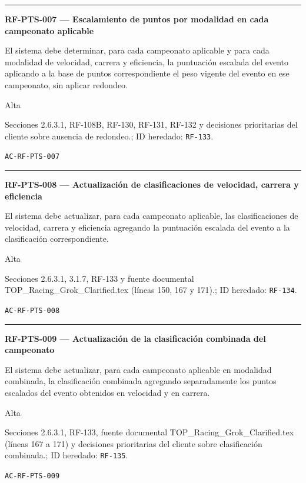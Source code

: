 \documentclass[10pt,letterpaper]{article}
\begin{document}
\vspace{0.25em}\hrule\vspace{0.65em}
\noindent\textbf{RF-PTS-007 --- Escalamiento de puntos por modalidad en cada campeonato aplicable}\par
\begin{description}[style=nextline,leftmargin=3.15cm,labelwidth=2.8cm,font=\normalfont\bfseries]
\item[Obligación] El sistema debe determinar, para cada campeonato aplicable y para cada modalidad de velocidad, carrera y eficiencia, la puntuación escalada del evento aplicando a la base de puntos correspondiente el peso vigente del evento en ese campeonato, sin aplicar redondeo.
\item[Prioridad] Alta
\item[Procedencia] Secciones 2.6.3.1, RF-108B, RF-130, RF-131, RF-132 y decisiones prioritarias del cliente sobre ausencia de redondeo.; ID heredado: \texttt{RF-133}.
\item[Verificación] \texttt{AC-RF-PTS-007}
\end{description}
\vspace{0.25em}\hrule\vspace{0.65em}
\noindent\textbf{RF-PTS-008 --- Actualización de clasificaciones de velocidad, carrera y eficiencia}\par
\begin{description}[style=nextline,leftmargin=3.15cm,labelwidth=2.8cm,font=\normalfont\bfseries]
\item[Obligación] El sistema debe actualizar, para cada campeonato aplicable, las clasificaciones de velocidad, carrera y eficiencia agregando la puntuación escalada del evento a la clasificación correspondiente.
\item[Prioridad] Alta
\item[Procedencia] Secciones 2.6.3.1, 3.1.7, RF-133 y fuente documental TOP\_Racing\_Grok\_Clarified.tex (líneas 150, 167 y 171).; ID heredado: \texttt{RF-134}.
\item[Verificación] \texttt{AC-RF-PTS-008}
\end{description}
\vspace{0.25em}\hrule\vspace{0.65em}
\noindent\textbf{RF-PTS-009 --- Actualización de la clasificación combinada del campeonato}\par
\begin{description}[style=nextline,leftmargin=3.15cm,labelwidth=2.8cm,font=\normalfont\bfseries]
\item[Obligación] El sistema debe actualizar, para cada campeonato aplicable en modalidad combinada, la clasificación combinada agregando separadamente los puntos escalados del evento obtenidos en velocidad y en carrera.
\item[Prioridad] Alta
\item[Procedencia] Secciones 2.6.3.1, RF-133, fuente documental TOP\_Racing\_Grok\_Clarified.tex (líneas 167 a 171) y decisiones prioritarias del cliente sobre clasificación combinada.; ID heredado: \texttt{RF-135}.
\item[Verificación] \texttt{AC-RF-PTS-009}
\end{description}
\end{document}
